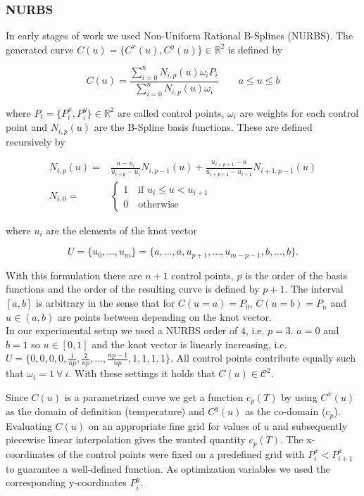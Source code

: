 \documentclass{scrartcl}[12pt, halfparskip]
\numberwithin{equation}{section}
\numberwithin{figure}{section}
\numberwithin{table}{section}
\begin{document}
\subsubsection{NURBS}
\label{sec:nurbs}
In early stages of work we used Non-Uniform Rational B-Splines (NURBS). The generated curve $C(u) = \{C^x(u), C^y(u) \} \in \mathbb{R}^2$ is defined by

\begin{equation}
	C(u) = \frac{\sum_{i=0}^{n} N_{i,p}(u) \omega_i P_i }{\sum_{i=0}^{n} N_{i,p}(u) \omega_i} \qquad a \le u \le b
\end{equation}

where $P_i = \{ P_i^x, P_i^y \} \in \mathbb{R}^2$ are called control points, $\omega_i$ are weights for each control point and $N_{i,p}(u)$ are the B-Spline basis functions. These are defined recursively by

\begin{align}
	N_{i,p}(u) = & \frac{u - u_i}{u_{i+p} - u_i} N_{i,p-1}(u) + \frac{u_{i+p+1} - u}{u_{i+p+1} - u_{i+1}} N_{i+1,p-1}(u) \label{eq:NURBS_basis_polynomial} \\[1ex]
	N_{i,0} = &
	\begin{cases}
		1 \quad \text{if } u_i \le u < u_{i+1} \\
		0 \quad \text{otherwise}
	\end{cases} \nonumber
\end{align}

where $u_i$ are the elements of the knot vector

\begin{equation}
	U = \{u_0,...,u_m\}=\{a,...,a,u_{p+1},...,u_{m-p-1},b,...,b\}.
\end{equation}

With this formulation there are $n+1$ control points, $p$ is the order of the basis functions and the order of the resulting curve is defined by $p+1$. The interval $[a,b]$ is arbitrary in the sense that for $C(u=a)=P_0$,  $C(u=b)=P_n$ and $u \in (a,b)$ are points between depending on the knot vector.\\

In our experimental setup we used a NURBS order of $4$, i.e. $p=3$. $a=0$ and $b=1$ so $u \in [0,1]$ and the knot vector is linearly increasing, i.e. $U = \{ 0,0,0,0,\frac{1}{n p},\frac{2}{n p},...,\frac{n p - 1}{n p},1,1,1,1 \}$. All control points contribute equally such that $\omega_i=1 \ \forall \ i$. With these settings it holds that $C(u) \in \mathcal{C}^2$.

Since $C(u)$ is a parametrized curve we get a function $c_p(T)$ by using $C^x(u)$ as the domain of definition (temperature) and $C^y(u)$ as the co-domain ($c_p$). Evaluating $C(u)$ on an appropriate fine grid for values of $u$ and subsequently piecewise linear interpolation gives the wanted quantity $c_p(T)$.
The x-coordinates of the control points were fixed on a predefined grid with $P_i^x < P_{i+1}^x$ to guarantee a well-defined function.
As optimization variables we used the corresponding y-coordinates $P_i^y$.
\end{document}
